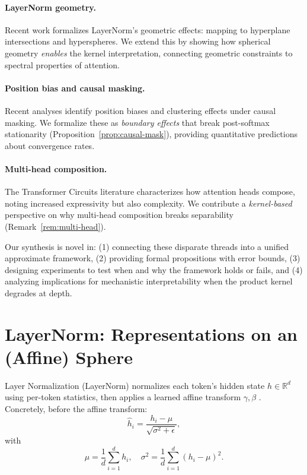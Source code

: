\documentclass[11pt]{article}
\theoremstyle{definition}
\begin{document}
\paragraph{LayerNorm geometry.} Recent work \cite{layernorm2024geometry,layernorm2024reintro} formalizes LayerNorm's geometric effects: mapping to hyperplane intersections and hyperspheres. We extend this by showing how spherical geometry \emph{enables} the kernel interpretation, connecting geometric constraints to spectral properties of attention.

\paragraph{Position bias and causal masking.} Recent analyses \cite{positionbias2025,clustering2024causal} identify position biases and clustering effects under causal masking. We formalize these as \emph{boundary effects} that break post-softmax stationarity (Proposition~\ref{prop:causal-mask}), providing quantitative predictions about convergence rates.

\paragraph{Multi-head composition.} The Transformer Circuits literature \cite{elhage2021framework} characterizes how attention heads compose, noting increased expressivity but also complexity. We contribute a \emph{kernel-based} perspective on why multi-head composition breaks separability (Remark~\ref{rem:multi-head}).

Our synthesis is novel in: (1) connecting these disparate threads into a unified approximate framework, (2) providing formal propositions with error bounds, (3) designing experiments to test when and why the framework holds or fails, and (4) analyzing implications for mechanistic interpretability when the product kernel degrades at depth.

\section{LayerNorm: Representations on an (Affine) Sphere}
\label{sec:ln}

Layer Normalization (LayerNorm) normalizes each token's hidden state \(h \in \mathbb{R}^d\) using per-token statistics, then applies a learned affine transform \(\gamma, \beta\) \cite{ba2016layer}. Concretely, before the affine transform:
\[
\hat{h}_i = \frac{h_i - \mu}{\sqrt{\sigma^2 + \epsilon}},
\]
with
\[
\mu = \frac{1}{d} \sum_{i=1}^d h_i,
\quad
\sigma^2 = \frac{1}{d} \sum_{i=1}^d (h_i - \mu)^2.
\]
\end{document}
